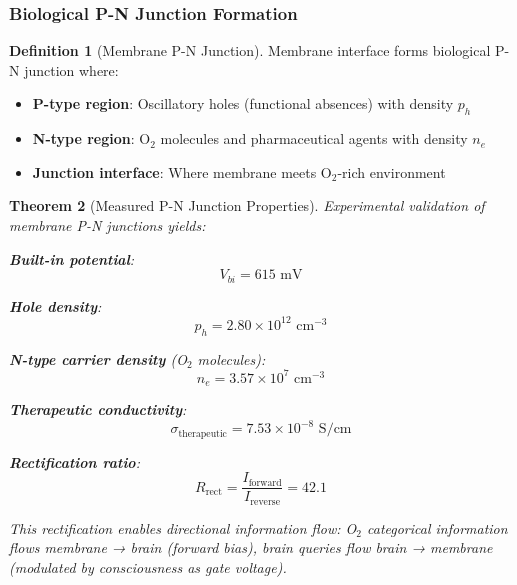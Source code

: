 \documentclass[11pt,a4paper]{article}
\newtheorem{theorem}{Theorem}[section]
\theoremstyle{definition}
\newtheorem{definition}[theorem]{Definition}
\theoremstyle{remark}
\begin{document}
\subsubsection{Biological P-N Junction Formation}

\begin{definition}[Membrane P-N Junction]
Membrane interface forms biological P-N junction where:
\begin{itemize}
\item \textbf{P-type region}: Oscillatory holes (functional absences) with density $p_h$
\item \textbf{N-type region}: O$_2$ molecules and pharmaceutical agents with density $n_e$
\item \textbf{Junction interface}: Where membrane meets O$_2$-rich environment
\end{itemize}
\end{definition}

\begin{theorem}[Measured P-N Junction Properties]
\label{thm:measured_junction}
Experimental validation of membrane P-N junctions yields:

\textbf{Built-in potential}:
\begin{equation}
V_{bi} = 615 \text{ mV}
\end{equation}

\textbf{Hole density}:
\begin{equation}
p_h = 2.80 \times 10^{12} \text{ cm}^{-3}
\end{equation}

\textbf{N-type carrier density} (O$_2$ molecules):
\begin{equation}
n_e = 3.57 \times 10^7 \text{ cm}^{-3}
\end{equation}

\textbf{Therapeutic conductivity}:
\begin{equation}
\sigma_{\text{therapeutic}} = 7.53 \times 10^{-8} \text{ S/cm}
\end{equation}

\textbf{Rectification ratio}:
\begin{equation}
R_{\text{rect}} = \frac{I_{\text{forward}}}{I_{\text{reverse}}} = 42.1
\end{equation}

This rectification enables directional information flow: O$_2$ categorical information flows membrane → brain (forward bias), brain queries flow brain → membrane (modulated by consciousness as gate voltage).
\end{theorem}
\end{document}
